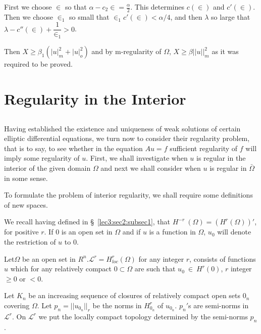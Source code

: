 First we choose $\in$ so that $\alpha - c_2 \in =
\frac{\alpha}{2}$. This determines $c(\in)$ and
$c'(\in)$. Then we choose $\in_1$ so small that
$\in_1 c'(\in) < \alpha / 4 $, and then $\lambda$ so
large that $\lambda - c''(\in) + \dfrac{1}{\in_1} > 0
$. 

Then $X \ge \beta_1 (|u|^2_m + | u|^2_o)$ and by m-regularity of
$\Omega$, $X \ge \beta || u ||^2_m$ as it was required to be proved. 

\section{Regularity in the Interior}\label{lec13:sec8} %

\subsection{}\label{lec13:sec8:subsec1}

Having established the existence and uniqueness of weak solutions of
certain elliptic differential equations, we turn now to consider
their regularity problem, that is to say, to see whether in the
equation $Au = f$ sufficient regularity of $f$ will imply some
regularity of $u$. First, we shall investigate when $u$ is regular in
the interior of the given domain $\Omega$ and next we shall consider
when $u$ is regular in $\bar{\Omega}$ in some sense. 

To formulate the problem of interior regularity, we shall require some
definitions of new spaces. 

We recall having defined in \S\ \ref{lec3:sec2:subsec1}, that $H^{-r} ~ (\Omega) =
(H^r(\Omega))'$, for positive $r$. If $0$ is an open set in $\Omega$
and if $u$ is a function in $\Omega$, $u_0$ will denote the
restriction of $u$ to $0$. 

\begin{definition}\label{lec13:sec8:subsec1:def8.1}%
  Let\pageoriginale $\Omega$ be an open set in $R^n. \mathscr{L}^r =
  H^r_{loc}(\Omega)$ for any integer $r$, consists of functions $u$
  which for any relatively compact $0 \subset \Omega$ are such that $u_0
  ~ \in ~ H^r (0)$, $r$ integer $\ge 0 \text{ or } < 0$. 
\end{definition}

Let $K_n$ be an increasing sequence of closures of relatively compact
open sets $0_n$ covering $\Omega$.  Let $p_n = || u_{0_n} ||_r$ be the
norms in $H_{0_n}^r$ of $u_{0_n}$. $p_n'$s are semi-norms in
$\mathscr{L}^r$. On $\mathscr{L}^r$ we put the locally compact
topology determined by the semi-norms $p_n$.  

